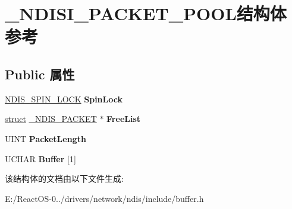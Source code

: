 \hypertarget{struct___n_d_i_s_i___p_a_c_k_e_t___p_o_o_l}{}\section{\+\_\+\+N\+D\+I\+S\+I\+\_\+\+P\+A\+C\+K\+E\+T\+\_\+\+P\+O\+O\+L结构体 参考}
\label{struct___n_d_i_s_i___p_a_c_k_e_t___p_o_o_l}
\subsection*{Public 属性}
\begin{DoxyCompactItemize}
\item 
\mbox{\label{struct___n_d_i_s_i___p_a_c_k_e_t___p_o_o_l_aa046fa307caec752353e3d3556ee74f8}} 
\hyperlink{struct___n_d_i_s___s_p_i_n___l_o_c_k}{N\+D\+I\+S\+\_\+\+S\+P\+I\+N\+\_\+\+L\+O\+CK} {\bfseries Spin\+Lock}
\item 
\mbox{\label{struct___n_d_i_s_i___p_a_c_k_e_t___p_o_o_l_ab1bd706c9d0f6a87292f6eff3a6a26b9}} 
\hyperlink{interfacestruct}{struct} \hyperlink{struct___n_d_i_s___p_a_c_k_e_t}{\+\_\+\+N\+D\+I\+S\+\_\+\+P\+A\+C\+K\+ET} $\ast$ {\bfseries Free\+List}
\item 
\mbox{\label{struct___n_d_i_s_i___p_a_c_k_e_t___p_o_o_l_a0d3db29b1dc2eb59085ce8f2bccd5896}} 
U\+I\+NT {\bfseries Packet\+Length}
\item 
\mbox{\label{struct___n_d_i_s_i___p_a_c_k_e_t___p_o_o_l_a9c093490c80bd63f3766d0da2438d3a7}} 
U\+C\+H\+AR {\bfseries Buffer} \mbox{[}1\mbox{]}
\end{DoxyCompactItemize}


该结构体的文档由以下文件生成\+:\begin{DoxyCompactItemize}
\item 
E\+:/\+React\+O\+S-\/0../drivers/network/ndis/include/buffer.\+h\end{DoxyCompactItemize}
